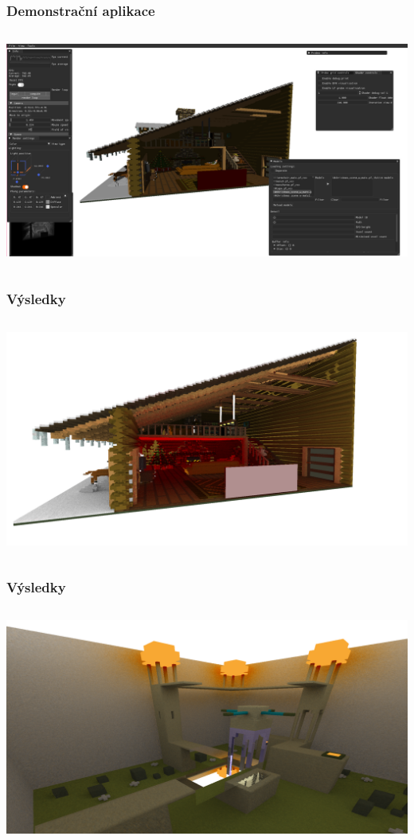 \documentclass[10pt,xcolor=pdflatex,hyperref={unicode},aspectratio=169]{beamer}
\begin{document}
\begin{frame}\frametitle{Demonstrační aplikace}
    \begin{column}{\textwidth}
        \includegraphics[width=\textwidth]{img/app.png}
    \end{column}
\end{frame}

\appendix


\begin{frame}\frametitle{Výsledky}
    \begin{column}{\textwidth}
        \includegraphics[width=\textwidth]{img/render1.png}
    \end{column}
\end{frame}

\begin{frame}\frametitle{Výsledky}
    \begin{column}{\textwidth}
        \includegraphics[width=\textwidth]{img/indirect_render_2.png}
    \end{column}
\end{frame}
\end{document}
